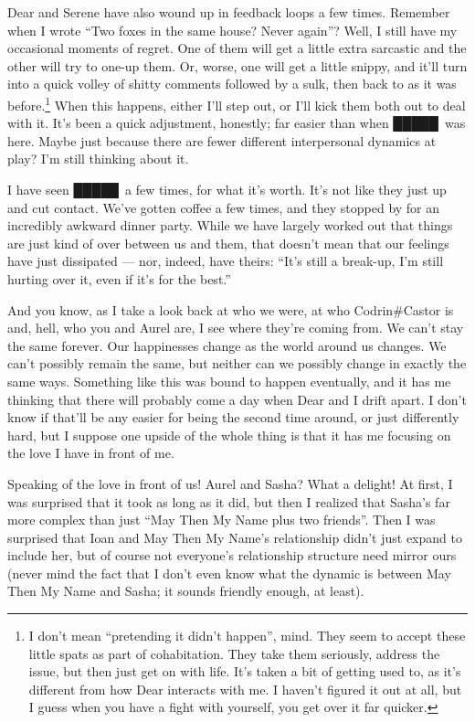 Dear and Serene have also wound up in feedback loops a few times. Remember when I wrote ``Two foxes in the same house? Never again''? Well, I still have my occasional moments of regret. One of them will get a little extra sarcastic and the other will try to one-up them. Or, worse, one will get a little snippy, and it'll turn into a quick volley of shitty comments followed by a sulk, then back to as it was before.\footnote{I don't mean ``pretending it didn't happen'', mind. They seem to accept these little spats as part of cohabitation. They take them seriously, address the issue, but then just get on with life. It's taken a bit of getting used to, as it's different from how Dear interacts with me. I haven't figured it out at all, but I guess when you have a fight with yourself, you get over it far quicker.} When this happens, either I'll step out, or I'll kick them both out to deal with it. It's been a quick adjustment, honestly; far easier than when █████\ was here. Maybe just because there are fewer different interpersonal dynamics at play? I'm still thinking about it.

I have seen █████\ a few times, for what it's worth. It's not like they just up and cut contact. We've gotten coffee a few times, and they stopped by for an incredibly awkward dinner party. While we have largely worked out that things are just kind of over between us and them, that doesn't mean that our feelings have just dissipated — nor, indeed, have theirs: ``It's still a break-up, I'm still hurting over it, even if it's for the best.''

And you know, as I take a look back at who we were, at who Codrin\#Castor is and, hell, who you and Aurel are, I see where they're coming from. We can't stay the same forever. Our happinesses change as the world around us changes. We can't possibly remain the same, but neither can we possibly change in exactly the same ways. Something like this was bound to happen eventually, and it has me thinking that there will probably come a day when Dear and I drift apart. I don't know if that'll be any easier for being the second time around, or just differently hard, but I suppose one upside of the whole thing is that it has me focusing on the love I have in front of me.

Speaking of the love in front of us! Aurel and Sasha? What a delight! At first, I was surprised that it took as long as it did, but then I realized that Sasha's far more complex than just ``May Then My Name plus two friends''. Then I was surprised that Ioan and May Then My Name's relationship didn't just expand to include her, but of course not everyone's relationship structure need mirror ours (never mind the fact that I don't even know what the dynamic is between May Then My Name and Sasha; it sounds friendly enough, at least).

